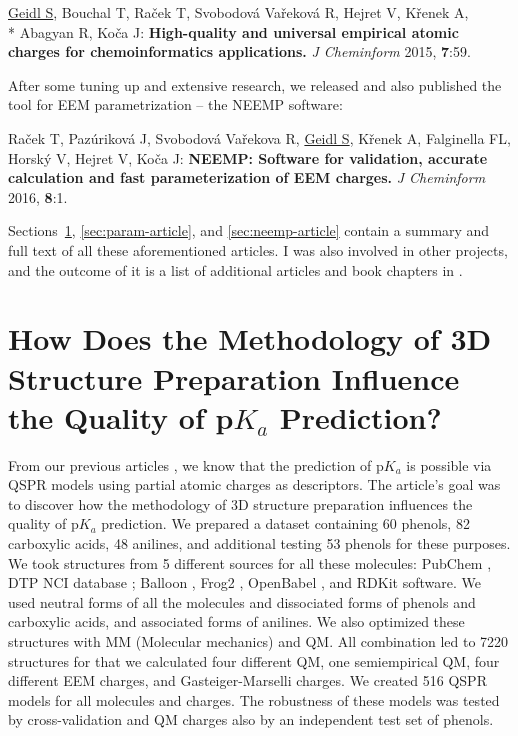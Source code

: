 \vspace{5mm}
\underline{Geidl S}, Bouchal T, Raček T, Svobodová Vařeková R, Hejret V,
Křenek A, \\* Abagyan R, Koča J: \textbf{High-quality and universal empirical atomic
charges for chemoinformatics applications.} \textit{J Cheminform} 2015,
\textbf{7}:59.
\vspace{5mm}

After some tuning up and extensive research, we released and also published
the tool for EEM parametrization -- the NEEMP software:

\vspace{5mm}
Raček T, Pazúriková J, Svobodová Vařekova R, \underline{Geidl S}, Křenek A,
Falginella FL, Horský V, Hejret V, Koča J: \textbf{NEEMP: Software
for validation, accurate calculation and fast parameterization of EEM charges.}
\textit{J Cheminform} 2016, \textbf{8}:1.
\vspace{5mm}

Sections~\ref{sec:pka-article}, \ref{sec:param-article}, and
\ref{sec:neemp-article} contain a summary and  full text of
all these aforementioned articles. I was also involved in other projects, and
the outcome of it is a list of additional articles and book chapters
in .

\section{How Does the Methodology of 3D Structure Preparation Influence
the Quality of p$K_a$ Prediction?} \label{sec:pka-article}

From our previous articles \cite{Svobodova2011, Svobodova2013}, we know that
the prediction of p$K_a$ is possible via QSPR models using partial atomic
charges as descriptors. The article's goal was to discover how the methodology
of 3D structure preparation influences the quality of p$K_a$ prediction.
We prepared a dataset containing 60 phenols, 82 carboxylic acids, 48 anilines,
and additional testing 53 phenols for these purposes. We took structures
from 5 different sources for all these mo\-le\-cules: PubChem \cite{pubchem},
DTP NCI database \cite{nci}; Balloon \cite{Vainio2007}, Frog2 \cite{frog2},
OpenBabel \cite{openbabel}, and RDKit \cite{rdkit} software. We used neutral forms of all
the molecules and dissociated forms of phenols and carboxylic acids, and
associated forms of anilines. We also optimized these structures with MM
(Molecular mechanics) and QM. All combination led to 7220 structures for that
we calculated four different QM, one semiempirical QM, four different EEM
charges, and Gasteiger-Marselli charges. We created 516 QSPR models for all
molecules and charges. The robustness of these models was tested by
cross-validation and QM charges also by an independent test set of phenols.

